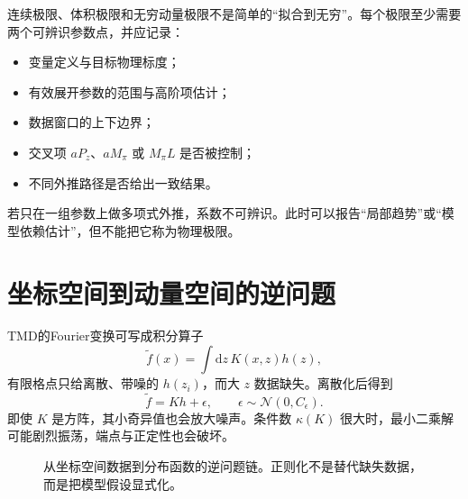 \documentclass[UTF8,12pt,a4paper,twoside,openany]{ctexbook}
\newcommand{\dd}{\mathrm{d}}
\begin{document}
连续极限、体积极限和无穷动量极限不是简单的“拟合到无穷”。每个极限至少需要两个可辨识参数点，并应记录：
\begin{itemize}
  \item 变量定义与目标物理标度；
  \item 有效展开参数的范围与高阶项估计；
  \item 数据窗口的上下边界；
  \item 交叉项 \(aP_z\)、\(aM_\pi\) 或 \(M_\pi L\) 是否被控制；
  \item 不同外推路径是否给出一致结果。
\end{itemize}
若只在一组参数上做多项式外推，系数不可辨识。此时可以报告“局部趋势”或“模型依赖估计”，但不能把它称为物理极限。

\section{坐标空间到动量空间的逆问题}

TMD的Fourier变换可写成积分算子
\begin{equation}
  \widetilde f(x)=\int\dd z\,K(x,z)h(z),
  \label{eq:inverse-integral}
\end{equation}
有限格点只给离散、带噪的 \(h(z_i)\)，而大 \(z\) 数据缺失。离散化后得到
\begin{equation}
  \widetilde f=K h+\epsilon,
  \qquad
  \epsilon\sim\mathcal N(0,C_\epsilon).
  \label{eq:inverse-discrete}
\end{equation}
即使 \(K\) 是方阵，其小奇异值也会放大噪声。条件数 \(\kappa(K)\) 很大时，最小二乘解可能剧烈振荡，端点与正定性也会破坏。

\begin{figure}[htbp]
\centering
{}
\caption{从坐标空间数据到分布函数的逆问题链。正则化不是替代缺失数据，而是把模型假设显式化。}
\label{fig:inverse-pipeline}
\end{figure}
\end{document}
